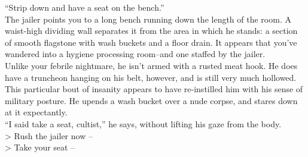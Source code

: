 “Strip down and have a seat on the bench.”\\

The jailer points you to a long bench running down the length of the room. A waist-high dividing wall separates it from the area in which he stands: a section of smooth flagstone with wash buckets and a floor drain. It appears that you’ve wandered into a hygiene processing room--and one staffed by the jailer.\\

Unlike your febrile nightmare, he isn’t armed with a rusted meat hook. He does have a truncheon hanging on his belt, however, and is still very much hollowed. This particular bout of insanity appears to have re-instilled him with his sense of military posture. He upends a wash bucket over a nude corpse, and stares down at it expectantly.\\

“I said take a seat, cultist,” he says, without lifting his gaze from the body.\\

> Rush the jailer now -- \\
> Take your seat -- 